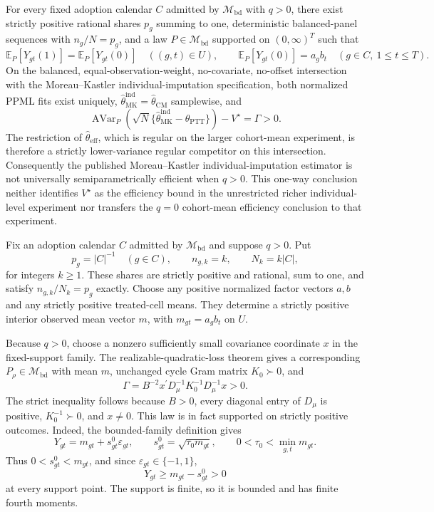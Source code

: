 For every fixed adoption calendar \(C\) admitted by \(\mathcal M_{\mathrm{bd}}\) with \(q>0\), there exist strictly positive rational shares \(p_g\) summing to one, deterministic balanced-panel sequences with \(n_g/N=p_g\), and a law \(P\in\mathcal M_{\mathrm{bd}}\) supported on \((0,\infty)^T\) such that
\[
\mathbb E_P[Y_{gt}(1)]=\mathbb E_P[Y_{gt}(0)]\quad((g,t)\in U),
\qquad
\mathbb E_P[Y_{gt}(0)]=a_gb_t\quad(g\in C,\ 1\le t\le T).
\]
On the balanced, equal-observation-weight, no-covariate, no-offset intersection with the Moreau--Kastler individual-imputation specification, both normalized PPML fits exist uniquely, \(\widehat\theta_{\mathrm{MK}}^{\mathrm{ind}}=\widehat\theta_{\mathrm{CM}}\) samplewise, and
\[
\operatorname{AVar}_P\!\left(\sqrt N\{\widehat\theta_{\mathrm{MK}}^{\mathrm{ind}}-\theta_{\mathrm{PTT}}\}\right)-V^{\star}
=\Gamma>0.
\]
The restriction of \(\widehat\theta_{\mathrm{eff}}\), which is regular on the larger cohort-mean experiment, is therefore a strictly lower-variance regular competitor on this intersection.  Consequently the published Moreau--Kastler individual-imputation estimator is not universally semiparametrically efficient when \(q>0\).  This one-way conclusion neither identifies \(V^{\star}\) as the efficiency bound in the unrestricted richer individual-level experiment nor transfers the \(q=0\) cohort-mean efficiency conclusion to that experiment.

Fix an adoption calendar \(C\) admitted by \(\mathcal M_{\mathrm{bd}}\) and suppose \(q>0\).  Put
\[
p_g=|C|^{-1}\quad(g\in C),
\qquad
n_{g,k}=k,
\qquad
N_k=k|C|,
\tag{1}
\]
for integers \(k\ge1\).  These shares are strictly positive and rational, sum to one, and satisfy \(n_{g,k}/N_k=p_g\) exactly.  Choose any positive normalized factor vectors \(a,b\) and any strictly positive treated-cell means.  They determine a strictly positive interior observed mean vector \(m\), with \(m_{gt}=a_gb_t\) on \(U\).

Because \(q>0\), choose a nonzero sufficiently small covariance coordinate \(x\) in the fixed-support family.  The realizable-quadratic-loss theorem gives a corresponding \(P_\rho\in\mathcal M_{\mathrm{bd}}\) with mean \(m\), unchanged cycle Gram matrix \(K_0\succ0\), and
\[
\Gamma
=B^{-2}x^{\prime}D_\mu^{-1}K_0^{-1}D_\mu^{-1}x
>0.
\tag{2}
\]
The strict inequality follows because \(B>0\), every diagonal entry of \(D_\mu\) is positive, \(K_0^{-1}\succ0\), and \(x\ne0\).  This law is in fact supported on strictly positive outcomes.  Indeed, the bounded-family definition gives
\[
Y_{gt}=m_{gt}+s^0_{gt}\varepsilon_{gt},
\qquad
s^0_{gt}=\sqrt{\tau_0m_{gt}},
\qquad
0<\tau_0<\min_{g,t}m_{gt}.
\tag{3}
\]
Thus \(0<s^0_{gt}<m_{gt}\), and since \(\varepsilon_{gt}\in\{-1,1\}\),
\[
Y_{gt}\ge m_{gt}-s^0_{gt}>0
\tag{4}
\]
at every support point.  The support is finite, so it is bounded and has finite fourth moments.

